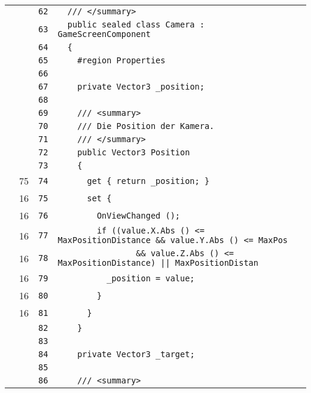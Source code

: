 \documentclass[a4paper,10pt]{article}
\begin{document}
\begin{longtable}[l]{lrrl}
\cellcolor{gray} &  & \verb~62~ & \verb~  /// </summary>~\\
\cellcolor{gray} &  & \verb~63~ & \verb~  public sealed class Camera : GameScreenComponent~\\
\cellcolor{gray} &  & \verb~64~ & \verb~  {~\\
\cellcolor{gray} &  & \verb~65~ & \verb~    #region Properties~\\
\cellcolor{gray} &  & \verb~66~ & \verb~~\\
\cellcolor{gray} &  & \verb~67~ & \verb~    private Vector3 _position;~\\
\cellcolor{gray} &  & \verb~68~ & \verb~~\\
\cellcolor{gray} &  & \verb~69~ & \verb~    /// <summary>~\\
\cellcolor{gray} &  & \verb~70~ & \verb~    /// Die Position der Kamera.~\\
\cellcolor{gray} &  & \verb~71~ & \verb~    /// </summary>~\\
\cellcolor{gray} &  & \verb~72~ & \verb~    public Vector3 Position~\\
\cellcolor{gray} &  & \verb~73~ & \verb~    {~\\
\cellcolor{green} & 75 & \verb~74~ & \verb~      get { return _position; }~\\
\cellcolor{green} & 16 & \verb~75~ & \verb~      set {~\\
\cellcolor{green} & 16 & \verb~76~ & \verb~        OnViewChanged ();~\\
\cellcolor{green} & 16 & \verb~77~ & \verb~        if ((value.X.Abs () <= MaxPositionDistance && value.Y.Abs () <= MaxPos~\\
\cellcolor{green} & 16 & \verb~78~ & \verb~                && value.Z.Abs () <= MaxPositionDistance) || MaxPositionDistan~\\
\cellcolor{green} & 16 & \verb~79~ & \verb~          _position = value;~\\
\cellcolor{green} & 16 & \verb~80~ & \verb~        }~\\
\cellcolor{green} & 16 & \verb~81~ & \verb~      }~\\
\cellcolor{gray} &  & \verb~82~ & \verb~    }~\\
\cellcolor{gray} &  & \verb~83~ & \verb~~\\
\cellcolor{gray} &  & \verb~84~ & \verb~    private Vector3 _target;~\\
\cellcolor{gray} &  & \verb~85~ & \verb~~\\
\cellcolor{gray} &  & \verb~86~ & \verb~    /// <summary>~\\

\end{longtable}
\end{document}
